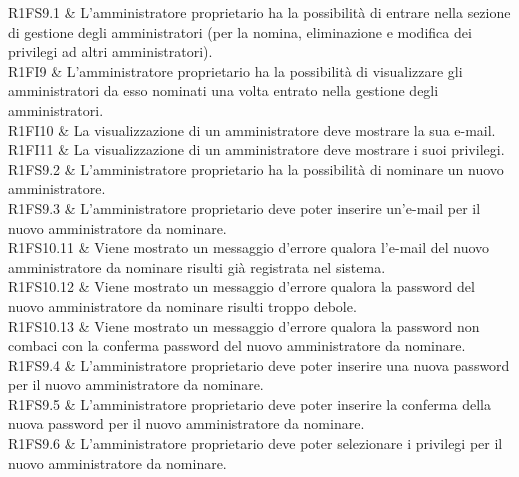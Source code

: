 

R1FS9.1 & L'amministratore proprietario ha la possibilità di entrare nella sezione di gestione degli amministratori (per la nomina, eliminazione e modifica dei privilegi ad altri amministratori). \\

R1FI9 & L'amministratore proprietario ha la possibilità di visualizzare gli amministratori da esso nominati una volta entrato nella gestione degli amministratori. \\

R1FI10 & La visualizzazione di un amministratore deve mostrare la sua e-mail. \\

R1FI11 & La visualizzazione di un amministratore deve mostrare i suoi privilegi. \\

R1FS9.2 & L'amministratore proprietario ha la possibilità di nominare un nuovo amministratore. \\

R1FS9.3 & L'amministratore proprietario deve poter inserire un'e-mail per il nuovo amministratore da nominare. \\

R1FS10.11 & Viene mostrato un messaggio d'errore qualora l'e-mail del nuovo amministratore da nominare risulti già registrata nel sistema. \\

R1FS10.12 & Viene mostrato un messaggio d'errore qualora la password del nuovo amministratore da nominare risulti troppo debole. \\

R1FS10.13 & Viene mostrato un messaggio d'errore qualora la password non combaci con la conferma password del nuovo amministratore da nominare. \\

R1FS9.4 & L'amministratore proprietario deve poter inserire una nuova password per il nuovo amministratore da nominare. \\

R1FS9.5 & L'amministratore proprietario deve poter inserire la conferma della nuova password per il nuovo amministratore da nominare. \\

R1FS9.6 & L'amministratore proprietario deve poter selezionare i privilegi per il nuovo amministratore da nominare. \\

